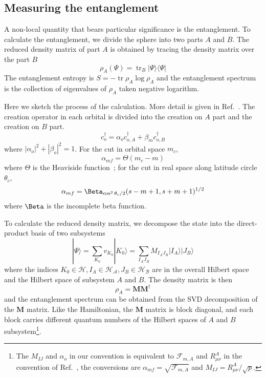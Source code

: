 \documentclass{timesjhep}
\begin{document}
\subsection{Measuring the entanglement}
\label{sec:ed_ent}

A non-local quantity that bears particular significance is the entanglement. To calculate the entanglement, we divide the sphere into two parts $A$ and $B$. The reduced density matrix of part $A$ is obtained by tracing the density matrix over the part $B$
\begin{equation}
    \rho_A(\Psi)=\operatorname{tr}_B|\Psi\rangle\langle\Psi|
\end{equation}
The entanglement entropy is $S=-\operatorname{tr}\rho_A\log\rho_A$ and the entanglement spectrum is the collection of eigenvalues of $\rho_A$ taken negative logarithm. 

Here we sketch the process of the calculation. More detail is given in Ref.~\cite{Sterdyniak2011RealEnt}.  The creation operator in each orbital is divided into the creation on $A$ part and the creation on $B$ part. 
\begin{equation}
    c^\dagger_o=\alpha_oc^\dagger_{o,A}+\beta_mc^\dagger_{o,B}
\end{equation}
where $|\alpha_o|^2+|\beta_o|^2=1$. For the cut in orbital space $m_c$, 
\begin{equation*}
    \alpha_{mf}=\Theta(m_c-m)
\end{equation*}
where $\Theta$ is the Heaviside function~; for the cut in real space along latitude circle $\theta_c$,
\begin{equation*}
    \alpha_{mf}=\Beta_{\cos^2\theta_c/2}(s-m+1,s+m+1)^{1/2}
\end{equation*}
where $\Beta$ is the incomplete beta function. 

To calculate the reduced density matrix, we decompose the state into the direct-product basis of two subsystems
\begin{equation}
    |\Psi\rangle=\sum_{K_0}v_{K_0}|K_0\rangle=\sum_{I_AJ_B}M_{I_AJ_B}|I_A\rangle|J_B\rangle
\end{equation}
where the indices $K_0\in\mathcal{H},I_A\in\mathcal{H_A},J_B\in\mathcal{H_B}$ are in the overall Hilbert space and the Hilbert space of subsystem $A$ and $B$. The density matrix is then 
\begin{equation}
    \rho_A=\mathbf{M}\mathbf{M}^\dagger
\end{equation}
and the entanglement spectrum can be obtained from the SVD decomposition of the $\mathbf{M}$ matrix. Like the Hamiltonian, the $\mathbf{M}$ matrix is block diagonal, and each block carries different quantum numbers of the Hilbert spaces of $A$ and $B$ subsystem\footnote{The $M_{IJ}$ and $\alpha_o$ in our convention is equivalent to $\mathcal{F}_{m,A}$ and $R_{\mu\nu}^A$ in the convention of Ref.~\cite{Sterdyniak2011RealEnt}, the conversions are $\alpha_{mf}=\sqrt{\mathcal{F}_{m,A}}$ and $M_{IJ}=R_{\mu\nu}^A/\sqrt{p}$.}. 
\end{document}
